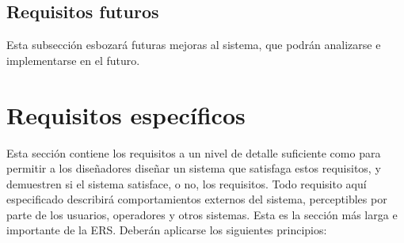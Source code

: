 \documentclass[12pt,a4paper]{article}
\begin{document}
\subsection{Requisitos futuros}
\label{sec:requisitos_futuros}

Esta subsección esbozará futuras mejoras al sistema, que podrán analizarse e implementarse en el futuro.   


\section{Requisitos específicos}
\label{sec:requisitos_especificos}

Esta sección contiene los requisitos a un nivel de detalle suficiente como para permitir a los diseñadores diseñar un sistema que satisfaga estos requisitos, y demuestren si el sistema satisface, o no, los requisitos. Todo requisito aquí especificado describirá comportamientos externos del sistema, perceptibles por parte de los usuarios, operadores y otros sistemas. Esta es la sección más larga e importante de la ERS. Deberán aplicarse los siguientes principios:
\end{document}
